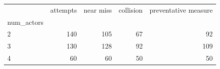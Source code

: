 \begin{tabular}{lrrrr}
\toprule
 & attempts & near miss & collision & preventative measure \\
num_actors &  &  &  &  \\
\midrule
2 & 140 & 105 & 67 & 92 \\
3 & 130 & 128 & 92 & 109 \\
4 & 60 & 60 & 50 & 50 \\
\bottomrule
\end{tabular}
